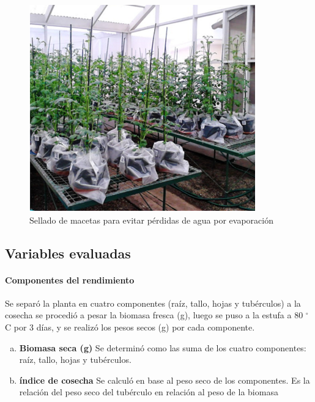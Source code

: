 \documentclass[fleqn,10pt]{Flavio}\usepackage[]{graphicx}\usepackage[]{color}
\begin{document}
\begin{figure}[ht]\centering
\includegraphics[width=\linewidth]{pots}
\caption{Sellado de macetas para evitar p\'erdidas de agua  por evaporaci\'on}
\label{fig:pots}
\end{figure}

\subsection{Variables evaluadas}

\paragraph{Componentes del rendimiento} Se separ\'o la planta en cuatro componentes (ra\'iz, tallo, hojas y tub\'erculos) a la cosecha se procedi\'o a pesar la biomasa fresca (g), luego se puso a la estufa a 80 $^{\circ}$C por 3 d\'ias, y se realiz\'o los pesos secos (g) por cada componente.

\begin{enumerate}[a),noitemsep]
  \item {\bf Biomasa seca (g)} Se determin\'o como las suma de los cuatro componentes: ra\'iz, tallo, hojas y tub\'erculos. 
  \item {\bf \'indice de cosecha} Se calcul\'o en base al peso seco de los componentes. Es la relaci\'on del peso seco del tub\'erculo en relaci\'on al peso de la biomasa
\end{enumerate}
\end{document}
